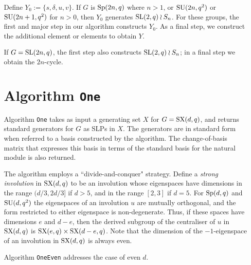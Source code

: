\documentclass[12pt]{article}
\def\SL{{\rm SL}}
\def\Sp{{\rm Sp}}
\def\SU{{\rm SU}}
\def\SX{{\rm SX}}
\begin{document}
Define $Y_0:=\{s,\delta,u,v\}$. 
If $G$ is $\Sp(2n, q)$ where $n > 1$, 
or $\SU (2n, q^2)$ or $\SU(2n + 1, q^2)$ for $n > 0$,
then $Y_0$ generates $\SL(2,q)\wr S_n$.
For these groups, the first and major step in our algorithm constructs $Y_0$.
As a final step, we construct the additional 
element or elements to obtain $Y$. 

If $G = \SL(2n, q)$, the first step also constructs 
$\SL(2,q)\wr S_{n}$; in a final step we obtain the $2n$-cycle. 

\section{Algorithm {\tt One}}
\label{Alg1}
Algorithm {\tt One} takes as input a generating set $X$ for
$G=\SX(d,q)$, and returns standard generators for $G$ as SLPs in $X$.
The generators are in standard form 
when referred to a basis constructed  by the algorithm. The change-of-basis 
matrix that expresses this basis in terms of the standard basis for the natural
module is also returned.

The algorithm employs a ``divide-and-conquer" strategy. Define a
{\it strong involution} in $\SX(d,q)$ to be an involution whose
eigenspaces have dimensions in the range $(d/3,2d/3]$ if $d>5$, and 
in the range $[2,3]$ if $d=5$. For $\Sp(d,q)$ and $\SU(d,q^2)$ the
eigenspaces of an involution $u$ are mutually orthogonal, and the form
restricted to either eigenspace is non-degenerate. Thus, if these
spaces have dimensions $e$ and $d-e$, then the derived subgroup of the
centraliser of $u$ in $\SX(d,q)$ is $\SX(e,q)\times\SX(d-e,q)$. Note
that the dimension of the $-1$-eigenspace of an involution in
$\SX(d,q)$ is always even.

Algorithm {\tt OneEven} addresses the case of even $d$.
\end{document}
